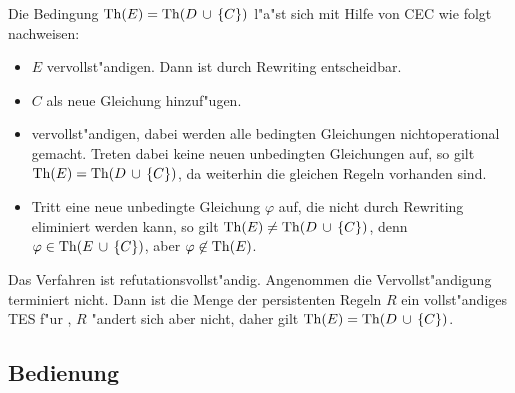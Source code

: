 Die Bedingung
\( \ThOf{E}=\ThOf{\union{D}{\eset{C}}} \)
l"a"st sich mit Hilfe von CEC wie folgt nachweisen:
\begin{itemize}
\item $E$ vervollst"andigen. Dann ist  durch Rewriting entscheidbar.
\item $C$ als neue Gleichung hinzuf"ugen.
\item vervollst"andigen, dabei werden alle bedingten Gleichungen nichtoperational
      gemacht. Treten dabei keine neuen unbedingten Gleichungen auf, so gilt
      \( \ThOf{E}=\ThOf{\union{D}{\eset{C}}} \),
      da weiterhin die gleichen Regeln vorhanden sind.
\item Tritt eine neue unbedingte Gleichung $\varphi$ auf, die nicht durch
      Rewriting eliminiert werden kann, so gilt
      \( \ThOf{E} \neq \ThOf{\union{D}{\eset{C}}} \),
      denn \( \varphi \in \ThOf{\union{E}{\eset{C}}} \),
      aber \( \varphi \not\in \ThOf{E} \).
\end{itemize}
Das Verfahren ist refutationsvollst"andig. Angenommen die
Vervollst"andigung terminiert nicht. Dann ist die Menge der
persistenten Regeln $R$ ein vollst"andiges TES f"ur ,
$R$ "andert sich aber nicht, daher gilt
\( \ThOf{E}=\ThOf{\union{D}{\eset{C}}} \).


\subsection{Bedienung}

